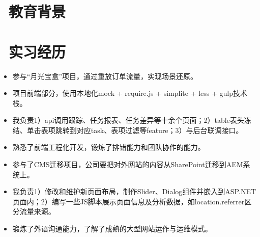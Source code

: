 \documentclass{resume}
\begin{document}




\section{\faGraduationCap\  教育背景}


\section{\faBriefcase\ 实习经历}
\begin{itemize}
  \item 参与“月光宝盒”项目，通过重放订单流量，实现场景还原。
  \item 项目前端部分，使用本地化mock + require.js + simplite + less + gulp技术栈。
  \item 我负责1）api调用跟踪、任务报表、任务差异等十余个页面；2）table表头冻结、单击表项跳转到对应task、表项过滤等feature；3）与后台联调接口。
  \item 熟悉了前端工程化开发，锻炼了排错能力和团队协作的能力。
\end{itemize}
\begin{itemize}
  \item 参与了CMS迁移项目，公司要把对外网站的内容从SharePoint迁移到AEM系统上。
  \item 我负责1）修改和维护新页面布局，制作Slider、Dialog组件并嵌入到ASP.NET页面内；2）编写一些JS脚本展示页面信息及分析数据，如location.referrer区分流量来源。
  \item 锻炼了外语沟通能力，了解了成熟的大型网站运作与运维模式。
\end{itemize}


\end{document}
